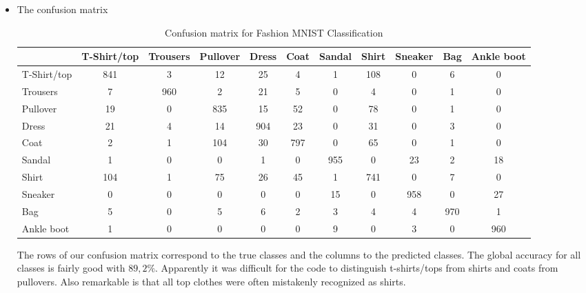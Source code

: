 \documentclass{article}
\begin{document}
\begin{itemize}
	\item The confusion matrix
	
	\begin{table}[!ht]
        \begin{tabular}{|l|c|c|c|c|c|c|c|c|c|c|}
        \hline
                  & T-Shirt/top & Trousers & Pullover & Dress & Coat & Sandal & Shirt & Sneaker & Bag & Ankle boot \\ \hline
      T-Shirt/top & 841         & 3        & 12       & 25    & 4    & 1      & 108   & 0       & 6   & 0          \\ \hline
      Trousers    & 7           & 960      & 2        & 21    & 5    & 0      & 4     & 0       & 1   & 0          \\ \hline
      Pullover    & 19          & 0        & 835      & 15    & 52   & 0      & 78    & 0       & 1   & 0          \\ \hline
      Dress       & 21          & 4        & 14       & 904   & 23   & 0      & 31    & 0       & 3   & 0          \\ \hline
      Coat        & 2           & 1        & 104      & 30    & 797  & 0      & 65    & 0       & 1   & 0          \\ \hline
      Sandal      & 1           & 0        & 0        & 1     & 0    & 955    & 0     & 23      & 2   & 18         \\ \hline
      Shirt       & 104         & 1        & 75       & 26    & 45   & 1      & 741   & 0       & 7   & 0          \\ \hline
      Sneaker     & 0           & 0        & 0        & 0     & 0    & 15     & 0     & 958     & 0   & 27         \\ \hline
      Bag         & 5           & 0        & 5        & 6     & 2    & 3      & 4     & 4       & 970 & 1          \\ \hline
      Ankle boot  & 1           & 0        & 0        & 0     & 0    & 9      & 0     & 3       & 0   & 960        \\ \hline
        \end{tabular}
        \caption{Confusion matrix for Fashion MNIST Classification}
        \end{table}
       
        The rows of our confusion matrix correspond to the true classes and the columns to the predicted classes. The global accuracy for all classes is fairly good with $89,2\%$. Apparently it was difficult for the code to distinguish t-shirts/tops from shirts and coats from pullovers. Also remarkable is that all top clothes were often mistakenly recognized as shirts.\\
      

\end{itemize}
\end{document}
